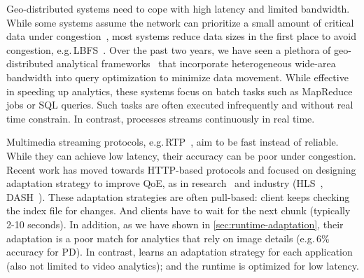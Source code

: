  Geo-distributed systems need to cope with high latency
and limited bandwidth. While some systems assume the network can prioritize a
small amount of critical data under congestion~\cite{cho2012surviving}, most
systems reduce data sizes in the first place to avoid congestion,
e.g.\,LBFS~\cite{muthitacharoen2001low}. Over the past two years, we have seen a
plethora of geo-distributed analytical frameworks~\cite{vulimiri2015wananlytics,
  vulimiri2015global, pu2015low, kloudas2015pixida, viswanathan2016clarinet}
that incorporate heterogeneous wide-area bandwidth into query optimization to
minimize data movement. While effective in speeding up analytics, these systems
focus on batch tasks such as MapReduce jobs or SQL queries. Such tasks are often
executed infrequently and without real time constrain. In contrast, \sysname{}
processes streams continuously in real time.









 Multimedia streaming protocols,
e.g.\,RTP~\cite{schulzrinne2006rtp}, aim to be fast instead of reliable. While
they can achieve low latency, their accuracy can be poor under congestion.
Recent work has moved towards HTTP-based protocols and focused on designing
adaptation strategy to improve QoE, as in research~\cite{mao2017neural,
  sun2016cs2p, yin2015control} and industry (HLS~\cite{pantos2016http},
DASH~\cite{michalos2012dynamic, sodagar2011mpeg}). These adaptation strategies
are often pull-based: client keeps checking the index file for changes. And
clients have to wait for the next chunk (typically 2-10 seconds). In addition,
as we have shown in \autoref{sec:runtime-adaptation}, their adaptation is a poor
match for analytics that rely on image details (e.g.\,6\% accuracy for PD). In
contrast, \sysname{} learns an adaptation strategy for each application (also
not limited to video analytics); and the runtime is optimized for low latency.


